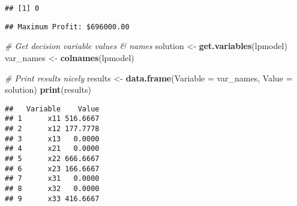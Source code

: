 \documentclass[
]{article}
\newenvironment{Shaded}{\begin{snugshade}}{\end{snugshade}}
\newcommand{\AttributeTok}[1]{\textcolor[rgb]{0.13,0.29,0.53}{#1}}
\newcommand{\CommentTok}[1]{\textcolor[rgb]{0.56,0.35,0.01}{\textit{#1}}}
\newcommand{\FunctionTok}[1]{\textcolor[rgb]{0.13,0.29,0.53}{\textbf{#1}}}
\newcommand{\NormalTok}[1]{#1}
\newcommand{\OtherTok}[1]{\textcolor[rgb]{0.56,0.35,0.01}{#1}}
\newcommand{\SpecialCharTok}[1]{\textcolor[rgb]{0.81,0.36,0.00}{\textbf{#1}}}
\newcommand{\StringTok}[1]{\textcolor[rgb]{0.31,0.60,0.02}{#1}}
\begin{document}
\begin{verbatim}
## [1] 0
\end{verbatim}

\begin{Shaded}
\end{Shaded}

\begin{verbatim}
## Maximum Profit: $696000.00
\end{verbatim}

\begin{Shaded}
\begin{Highlighting}[]
\CommentTok{\# Get decision variable values \& names}
\NormalTok{solution }\OtherTok{\textless{}{-}} \FunctionTok{get.variables}\NormalTok{(lpmodel)}
\NormalTok{var\_names }\OtherTok{\textless{}{-}} \FunctionTok{colnames}\NormalTok{(lpmodel)}


\CommentTok{\# Print results nicely}
\NormalTok{results }\OtherTok{\textless{}{-}} \FunctionTok{data.frame}\NormalTok{(}\AttributeTok{Variable =}\NormalTok{ var\_names, }\AttributeTok{Value =}\NormalTok{ solution)}
\FunctionTok{print}\NormalTok{(results)}
\end{Highlighting}
\end{Shaded}

\begin{verbatim}
##   Variable    Value
## 1      x11 516.6667
## 2      x12 177.7778
## 3      x13   0.0000
## 4      x21   0.0000
## 5      x22 666.6667
## 6      x23 166.6667
## 7      x31   0.0000
## 8      x32   0.0000
## 9      x33 416.6667
\end{verbatim}
\end{document}
